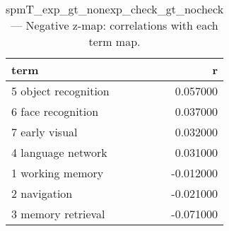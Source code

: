 \begin{table}
\caption{spmT_exp_gt_nonexp_check_gt_nocheck — Negative z-map: correlations with each term map.}
\label{tab:spmT_exp_gt_nonexp_check_gt_nocheck_neg}
\begin{tabular}{lr}
\toprule
term & r \\
\midrule
5 object recognition & 0.057000 \\
6 face recognition & 0.037000 \\
7 early visual & 0.032000 \\
4 language network & 0.031000 \\
1 working memory & -0.012000 \\
2 navigation & -0.021000 \\
3 memory retrieval & -0.071000 \\
\bottomrule
\end{tabular}
\end{table}
